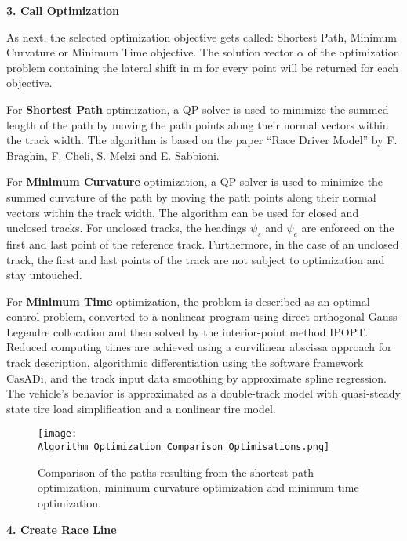 \textbf{3. Call Optimization}

As next, the selected optimization objective gets called: Shortest Path, Minimum Curvature or Minimum Time objective. The solution vector $\alpha$ of the optimization problem containing the lateral shift in m for every point will be returned for each objective.

For \textbf{Shortest Path} optimization, a QP solver is used to minimize the summed length of the path by moving the path points along their normal vectors within the track width. The algorithm is based on the paper ``Race Driver Model'' by F. Braghin, F. Cheli, S. Melzi and E. Sabbioni. \cite{shortest_path}

For \textbf{Minimum Curvature} optimization, a QP solver is used to minimize the summed curvature of the path by moving the path points along their normal vectors within the track width. The algorithm can be used for closed and unclosed tracks. For unclosed tracks, the headings $\psi_s$ and $\psi_e$ are enforced on the first and last point of the reference track. Furthermore, in the case of an unclosed track, the first and last points of the track are not subject to optimization and stay untouched. \cite{minimum_curvature_trajectory_planning}

For \textbf{Minimum Time} optimization, the problem is described as an optimal control problem, converted to a nonlinear program using direct orthogonal Gauss-Legendre collocation and then solved by the interior-point method IPOPT. Reduced computing
times are achieved using a curvilinear abscissa approach for track description, algorithmic differentiation using the software framework CasADi, and the track input data smoothing by approximate spline regression. The vehicle's behavior is approximated as a double-track model with quasi-steady state tire load simplification and a nonlinear tire model. \cite{minimum_time_trajectory_planning} \cite{powertrain_behaviour}

\begin{figure}[H]
    \centering
    \texttt{[image: Algorithm\_Optimization\_Comparison\_Optimisations.png]}
    \caption{Comparison of the paths resulting from the shortest path optimization, minimum curvature optimization and minimum time optimization. \cite{minimum_curvature_trajectory_planning}}
    \label{fig:Optimization Algorithm Comparing Different Optimisations}
\end{figure}

\textbf{4. Create Race Line}

